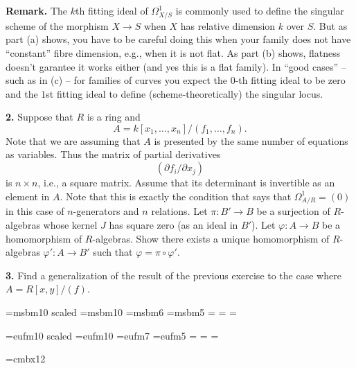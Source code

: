 \medskip\noindent
{\bf Remark.} The $k$th fitting ideal of $\Omega^1_{X/S}$ is commonly used
to define the singular scheme of the morphism $X \to S$ when $X$ has relative
dimension $k$ over $S$. But as part (a) shows, you have to be careful doing
this when your family does not have ``constant'' fibre dimension, e.g., when 
it is not flat. As part (b) shows, flatness doesn't garantee it works either
(and yes this is a flat family). In ``good cases'' -- such as in (c) -- for
families of curves you expect the $0$-th fitting ideal to be zero and
the $1$st fitting ideal to define (scheme-theoretically) the singular locus.

\medskip\item{\bf 2.} Suppose that $R$ is a ring and 
$$
A = k[x_1,\ldots,x_n]/(f_1,\ldots,f_n).
$$
Note that we are assuming that $A$ is presented by the same
number of equations as variables. Thus the matrix of partial
derivatives
$$
( \partial f_i / \partial x_j )
$$
is $n\times n$, i.e., a square matrix. Assume that
its determinant is invertible as an element in $A$. Note that
this is exactly the condition that says that $\Omega^1_{A/R} = (0)$
in this case of $n$-generators and $n$ relations.
Let $\pi : B' \to B$ be a surjection of $R$-algebras 
whose kernel $J$ has square zero (as an ideal in $B'$).
Let $\varphi : A \to B$ be a homomorphism of $R$-algebras. 
Show there exists a unique homomorphism of $R$-algebras
$\varphi' : A \to B'$ such that $\varphi = \pi \circ \varphi'$.

\medskip\item{\bf 3.} Find a generalization
of the result of the previous exercise to the case where $A=R[x,y]/(f)$.

\bye
\nopagenumbers

\font\gbbb=msbm10 scaled 
\font\bbbf=msbm10 
\font\sbbb=msbm6 
\font\ssbbb=msbm5 
=\bbbf
{}=\sbbb 
{}=\ssbbb 
\def\bbb{\fam6}
\def\mA{{\bbb A}} 
\def\mB{{\bbb B}} 
\def\mC{{\bbb C}}
\def\mF{{\bbb F}}
\def\mN{{\bbb N}}
\def\mP{{\bbb P}} 
\def\mQ{{\bbb Q}} 
\def\mR{{\bbb R}}
\def\mZ{{\bbb Z}}

\font\ggothic=eufm10 scaled 
\font\gothicf=eufm10
\font\sgothic=eufm7
\font\ssgothic=eufm5
=\gothicf
{}=\sgothic
{}=\ssgothic
\def\gothic{\fam5}


\font\Kopfont=cmbx12
\def\mapright#1{\smash{\mathop{\longrightarrow}\limits^{#1}}}
\def\mapdown#1{\Big\downarrow\rlap{$\vcenter{\hbox{$\scriptstyle#1$}}$}}
\def\downmap#1{\downarrow\rlap{$\vcenter{\hbox{$\scriptstyle#1$}}$}}
\def\mapup#1{\Big\uparrow\rlap{$\vcenter{\hbox{$\scriptstyle#1$}}$}}
\def\longlongrightarrow{\relbar \joinrel \longrightarrow}
\def\cC{{\cal C}}
\def\cD{{\cal D}}
\def\gp{{\gothic p}}
\def\gq{{\gothic q}}
\def\Spec{\mathop{\rm Spec}}
\def\Proj{\mathop{\rm Proj}}
\def\length{\mathop{\rm length}\nolimits}

